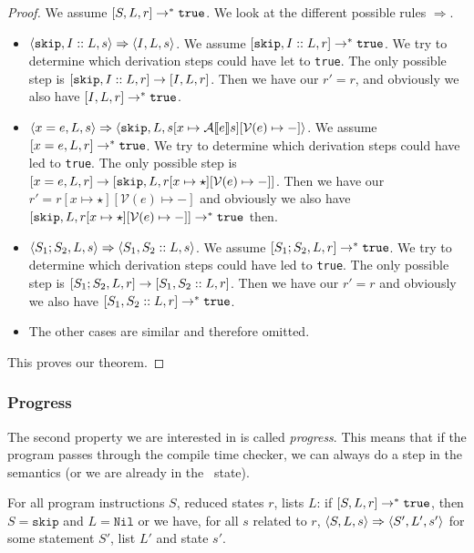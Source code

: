 \begin{proof}
We assume $[ S, L, r ] \to ^* \texttt{true}$. We look at the different possible rules $\Rightarrow$. 
\begin{itemize}[noitemsep]
    \item $\langle \texttt{skip}, I::L, s \rangle \Rightarrow \langle I, L, s \rangle$. We assume $[ \texttt{skip}, I::L, r ] \to ^* \texttt{true}$. We try to determine which derivation steps could have let to \texttt{true}. The only possible step is $[ \texttt{skip}, I::L, r ]\to [ I, L, r ]$. Then we have our $r' = r$, and obviously we also have $[ I, L, r ] \to^* \texttt{true}$.
    
    \item $\langle x = e, L, s \rangle \Rightarrow \langle \texttt{skip}, L, s[x \mapsto \mathcal{A} \llbracket e \rrbracket s][\mathcal{V}(e)\mapsto-] \rangle$. We assume $[ x = e, L, r ] \to ^* \texttt{true}$. We try to determine which derivation steps could have led to \texttt{true}. The only possible step is $[ x=e, L, r ] \to [ \texttt{skip}, L, r[x\mapsto \star][\mathcal{V}(e) \mapsto -] ]$. Then we have our $r' = r[x\mapsto \star][\mathcal{V}(e) \mapsto -]$ and obviously we also have $[ \texttt{skip}, L, r[x\mapsto \star][\mathcal{V}(e) \mapsto -] ] \to^* \texttt{true}$ then.
    
    \item $\langle S_1; S_2, L, s \rangle \Rightarrow \langle S_1, S_2::L, s \rangle$. We assume $[ S_1; S_2, L, r ] \to ^* \texttt{true}$. We try to determine which derivation steps could have led to \texttt{true}. The only possible step is $[ S_1; S_2, L, r ] \to [ S_1, S_2::L, r ]$. Then we have our $r' = r$ and obviously we also have $[ S_1, S_2::L, r ] \to^* \texttt{true}$.
    \item The other cases are similar and therefore omitted.
\end{itemize}
This proves our theorem.
\end{proof}

\subsubsection{Progress}
The second property we are interested in is called \emph{progress}. This means that if the program passes through the compile time checker, we can always do a step in the semantics (or we are already in the \sk ~state). 

\begin{theorem}
\label{progress}
For all program instructions $S$, reduced states $r$, lists $L$: if $[ S, L, r ] \to ^* \texttt{true}$, then $S = \texttt{skip}$ and $L = \texttt{Nil}$ or we have, for all $s$ related to $r$, $\langle S, L, s \rangle \Rightarrow \langle S', L', s' \rangle$ for some statement $S'$, list $L'$ and state $s'$.
\end{theorem}


